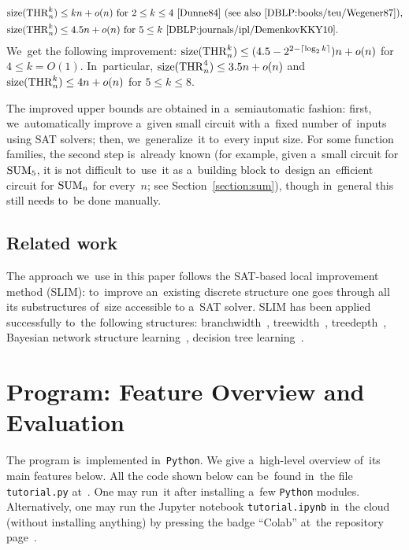 \begin{itemize}
\begin{align*}
        \size(\THR_n^k) &\le kn+o(n) \text{ for $2 \le k \le 4$~\cite{Dunne84} (see also~\cite[6.2, Theorem~2.3]{DBLP:books/teu/Wegener87}),}\\
        \size(\THR_n^k) &\le 4.5n+o(n) \text{ for $5 \le k$~\cite{DBLP:journals/ipl/DemenkovKKY10}.}
    \end{align*}
    We~get the following improvement:
        $\operatorname{size}(\operatorname{THR}_n^k) \le (4.5-2^{2-\lceil\log_2k\rceil})n+o(n)$ for $4 \le k = O(1)$.
    In~particular, $\operatorname{size}(\operatorname{THR}_n^4) \le 3.5n+o(n)$ and $\operatorname{size}(\operatorname{THR}_n^k) \le 4n+o(n)$ for $5 \le k \le 8$.
\end{itemize}
The improved upper bounds are obtained in a~semiautomatic fashion:
    first, we~automatically improve a~given small circuit with a~fixed number of~inputs using SAT solvers;
    then, we~generalize~it to~every input size.
For some function families,
the second step is~already known (for example, given a~small circuit
for $\operatorname{SUM}_5$, it is not difficult to~use~it as a~building block
to~design an~efficient circuit for $\operatorname{SUM}_n$ for every~$n$; see Section~\ref{section:sum}), though in~general this still needs to~be
done manually.

\subsection{Related work}
The approach we~use in this paper follows the SAT-based
local improvement method (SLIM): to~improve an~existing
discrete structure one goes through all its substructures
of~size accessible to a~SAT solver.
SLIM has been applied successfully to~the following
structures:
branchwidth~\cite{DBLP:journals/tocl/LodhaOS19},
treewidth~\cite{DBLP:conf/sat/FichteLS17},
treedepth~\cite{DBLP:conf/cp/RamaswamyS20},
Bayesian network structure learning~\cite{DBLP:conf/aaai/RamaswamyS21},
decision tree learning~\cite{DBLP:conf/aaai/SchidlerS21}.

\section{Program: Feature Overview and Evaluation}
The program is~implemented in~\texttt{Python}.
We give a~high-level overview of~its main features below.
All the code shown below
can be~found in~the
file \texttt{tutorial.py} at~\cite{git-improvement}.
One may run~it after installing a~few \texttt{Python} modules. Alternatively, one may run the Jupyter notebook
\texttt{tutorial.ipynb} in~the cloud (without installing
anything) by pressing the badge ``Colab''
at~the repository page~\cite{git-improvement}.

